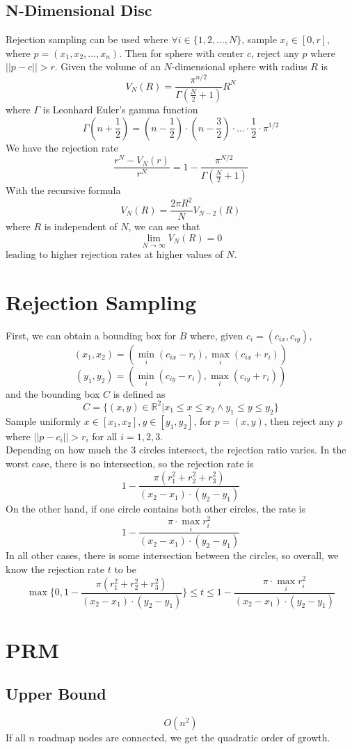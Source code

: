 \subsection{N-Dimensional Disc}
Rejection sampling can be used where $\forall i \in \{1,2,\dots,N\}$,
sample $x_i\in[0,r]$, where $p=(x_1,x_2,\dots,x_n)$.
Then for sphere with center $c$, reject any $p$ where $||p-c||>r$.
Given the volume of an $N$-dimensional sphere with radius $R$ is \cite{gipple14}
\[V_N(R)=\frac{\pi^{n/2}}{\Gamma\left(\frac{N}{2}+1\right)}R^N\]
where $\Gamma$ is Leonhard Euler's gamma function
\[\Gamma(n+\frac{1}{2})
=(n-\frac{1}{2})\cdot(n-\frac{3}{2})\cdot\dots\cdot\frac{1}{2}\cdot\pi^{1/2}\]
We have the rejection rate
\[\frac{r^N-V_N(r)}{r^N}=1-\frac{\pi^{N/2}}{\Gamma\left(\frac{N}{2}+1\right)}\]
With the recursive formula
\[V_N(R)=\frac{2\pi R^2}{N}V_{N-2}(R)\]
where $R$ is independent of $N$, we can see that
\[\lim_{N\rightarrow\infty}V_N(R)=0\]
leading to higher rejection rates at higher values of $N$.

\newpage
\section{Rejection Sampling}
First, we can obtain a bounding box for $B$ where,
given $c_i=(c_{ix},c_{iy})$,
\[(x_1,x_2)=(\min_i (c_{ix}-r_i),\max_i (c_{ix}+r_i))\]
\[(y_1,y_2)=(\min_i (c_{iy}-r_i),\max_i (c_{iy}+r_i))\]
and the bounding box $C$ is defined as 
\[C=\{(x,y)\in\mathbb{R}^2 | x_1\leq x \leq x_2 \wedge y_1\leq y \leq y_2\}\]
Sample uniformly $x\in[x_1,x_2],y\in[y_1,y_2]$, for $p=(x,y)$,
then reject any $p$ where $||p-c_i||>r_i$ for all $i=1,2,3$.\\
Depending on how much the 3 circles intersect, the rejection ratio varies.
In the worst case, there is no intersection, so the rejection rate is
\[1-\frac{\pi(r_1^2+r_2^2+r_3^2)}{(x_2-x_1)\cdot(y_2-y_1)}\]
On the other hand, if one circle contains both other circles, the rate is
\[1-\frac{\pi\cdot\max_i r_i^2}{(x_2-x_1)\cdot(y_2-y_1)}\]
In all other cases, there is some intersection between the circles,
so overall, we know the rejection rate $t$ to be
\[\max\{0,1-\frac{\pi(r_1^2+r_2^2+r_3^2)}{(x_2-x_1)\cdot(y_2-y_1)}\}\leq t 
\leq 1-\frac{\pi\cdot\max_i r_i^2}{(x_2-x_1)\cdot(y_2-y_1)}\]
\newpage
\section{PRM}
\subsection{Upper Bound}
\[O(n^2)\]
If all $n$ roadmap nodes are connected, we get the quadratic order of growth.


